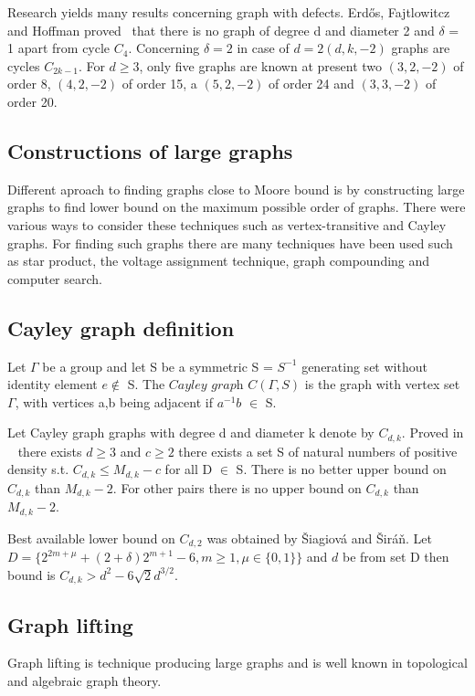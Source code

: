 \documentclass[a4paper,11pt,twoside]{report}%
\begin{document}
Research yields many results concerning graph with defects. Erdős, Fajtlowitcz and Hoffman proved~\cite{Erdos-Fajtlowicz-Hoffman} that there is no graph of degree d and diameter 2 and $\delta$ = 1 apart from cycle $C_{4}$.  
Concerning $\delta = 2$ in case of $d = 2 (d,k,-2)$ graphs are cycles $C_{2k-1}$. For $d \geq 3$, only five graphs are known at present two $(3,2,-2)$ of order 8, $(4,2,-2)$ of order 15, a $(5,2,-2)$ of order 24 and $(3,3,-2)$ of order 20.

\subsection{Constructions of large graphs}
Different aproach to finding graphs close to Moore bound is by constructing large graphs to find lower bound on the maximum possible order of graphs. There were various ways to consider these techniques such as vertex-transitive and Cayley graphs. For finding such graphs there are many techniques have been used such as star product, the voltage assignment technique, graph compounding and computer search. \\

\subsection{Cayley graph definition}
Let $\Gamma$ be a group and let S be a symmetric S = $S^{-1}$ generating set without identity element  $e\not\in$ S. The $\textit{Cayley graph}$ $C(\Gamma,S)$ is the graph with vertex set $\Gamma$, with vertices a,b being adjacent if $a^{-1}b$ $\in$ S.

Let Cayley graph graphs with degree d and diameter k denote by $C_{d,k}$. Proved in ~\cite{Jajcay-Macaj-Siran} there exists $d \geq 3$ and $c \geq 2$ there exists a set S of natural numbers of positive density s.t. $C_{d,k} \leq M_{d,k}-c$ for all D $\in$ S. There is no better upper bound on $C_{d,k}$ than $M_{d,k} - 2$. For other pairs there is no upper bound on $C_{d,k}$ than $M_{d,k} - 2$.
 
Best available lower bound on $C_{d,2}$ was obtained by Šiagiová and Širáň. Let $D = \{ 2^{2m+\mu}+(2+\delta)2^{m+1}-6,m \geq 1, \mu \in \{0,1\} \}$ and $d$ be from set D then bound is $C_{d,k} > d^{2} - 6\sqrt{2}d^{3/2}$.

\subsection{Graph lifting}
Graph lifting is technique producing large graphs and is well known in topological and algebraic graph theory.~\cite{Gross-Tucker} 
\end{document}
